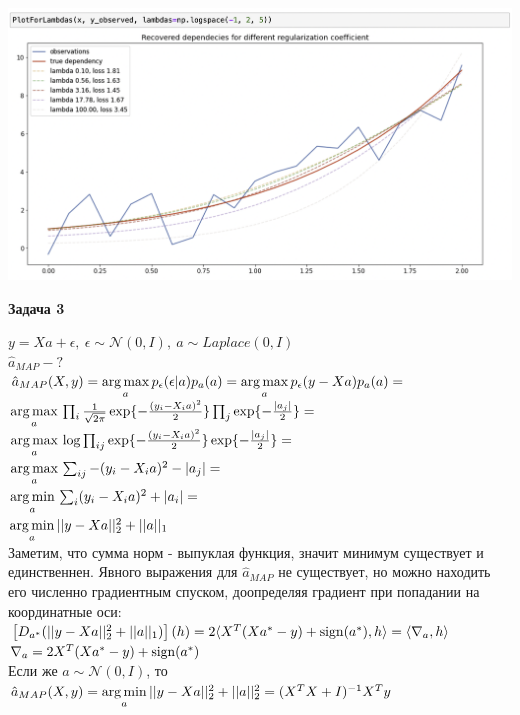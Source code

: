 \documentclass[10pt]{article}
\newcommand{\argmin}{\mathop{\rm arg\,min}\limits}
\newcommand{\argmax}{\mathop{\rm arg\,max}\limits}
\newcommand{\sign}{\mathop{\rm sign}\limits}
\begin{document}
\includegraphics[width=.8\textwidth]{Screenshot 2022-04-05 at 16.51.06}\\

\bigskip


\textbf{Задача 3}

\medskip

$y = Xa + \epsilon, \medspace \epsilon \sim \mathcal{N}(0, I), \medspace a \sim Laplace(0, I)$\\

$\hat{a}_{MAP} - ?$\\

$\hat{a}_{MAP}(X, y) = \underset{a}{\argmax} \thinspace p_\epsilon(\epsilon| a)p_a(a)=\underset{a}{\argmax} \thinspace p_\epsilon(y - Xa)p_a(a)=$\\

$\underset{a}{\argmax} \thinspace \prod_{i} \frac{1}{\sqrt{2\pi}} \exp\{-\frac{(y_i - X_ia)^2}{2}\}\prod_{j}\exp\{-\frac{|a_j|}{2}\} =$\\

$\underset{a}{\argmax} \thinspace\log \prod_{ij}\exp\{-\frac{(y_i - X_ia)^2}{2}\}\exp\{-\frac{|a_j|}{2}\} =$\\

$\underset{a}{\argmax} \thinspace \sum_{ij} -(y_i - X_ia)^2-|a_j| =$\\

$\underset{a}{\argmin} \thinspace \sum_{i} (y_i - X_ia)^2 + |a_i| =$\\

$\underset{a}{\argmin} \thinspace  ||y - Xa||_2^2 + ||a||_1 $\\

Заметим, что сумма норм - выпуклая функция, значит минимум существует и единственнен. Явного выражения для $\hat{a}_{MAP}$ не существует, но можно находить его численно градиентным спуском, доопределяя градиент при попадании на координатные оси:\\

$\left[ D_{a^*}(||y - Xa||_2^2 + ||a||_1) \right](h) = 2\langle X^T(Xa^* - y) + \sign (a^*) ,h\rangle = \langle \nabla_a, h \rangle$\\

$\nabla_a = 2X^T(Xa^* - y) + \sign (a^*) $\\

Если же $a \sim \mathcal{N}(0, I)$, то\\

$\hat{a}_{MAP}(X, y) = \underset{a}{\argmin} \thinspace  ||y - Xa||_2^2 + ||a||^2_2 =
( X^TX + I)^{-1}  X^Ty$\\
\end{document}
